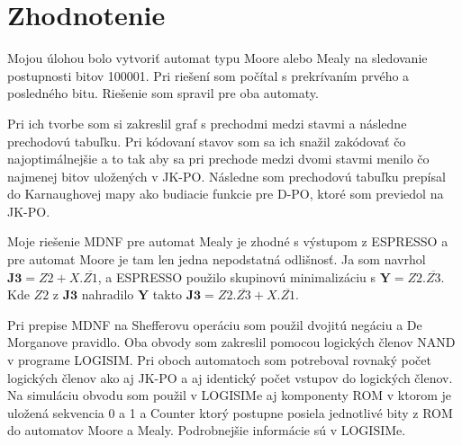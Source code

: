 \documentclass{article}
\begin{document}
\section{Zhodnotenie}
Mojou úlohou bolo vytvoriť automat typu Moore alebo Mealy na sledovanie postupnosti bitov 100001. Pri riešení som počítal s prekrívaním prvého a posledného bitu. Riešenie som spravil pre oba automaty. 

Pri ich tvorbe som si zakreslil graf s prechodmi medzi stavmi a následne prechodovú tabuľku. Pri kódovaní stavov som sa ich snažil zakódovať čo najoptimálnejšie a to tak aby sa pri prechode medzi dvomi stavmi menilo čo najmenej bitov uložených v JK-PO. Následne som prechodovú tabuľku prepísal do Karnaughovej mapy ako budiacie funkcie pre D-PO, ktoré som previedol na JK-PO.

Moje riešenie MDNF pre automat Mealy je zhodné s výstupom z ESPRESSO a pre automat Moore je tam len jedna nepodstatná odlišnosť. Ja som navrhol $\textbf{J3}=Z2+X.\overline{Z1}$, a ESPRESSO použilo skupinovú minimalizáciu s $\textbf{Y}=Z2.\overline{Z3}$. Kde $Z2$ z $\textbf{J3}$ nahradilo $\textbf{Y}$ takto $\textbf{J3}=Z2.\overline{Z3}+X.\overline{Z1}$.

Pri prepise MDNF na Shefferovu operáciu som použil dvojitú negáciu a De Morganove pravidlo. Oba obvody som zakreslil pomocou logických členov NAND v programe LOGISIM. Pri oboch automatoch som potreboval rovnaký počet logických členov ako aj JK-PO a aj identický počet vstupov do logických členov. Na simuláciu obvodu som použil v LOGISIMe aj komponenty ROM v ktorom je uložená sekvencia 0 a 1 a Counter ktorý postupne posiela jednotlivé bity z ROM do automatov Moore a Mealy. Podrobnejšie informácie sú v LOGISIMe.
\end{document}
